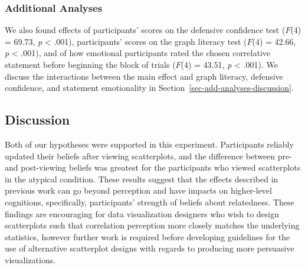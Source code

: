 \documentclass[manuscript,screen,review,anonymous]{acmart}
\begin{document}
\begin{table}

\caption{\label{tbl-condition-interact}Statistics for the significant
main effect of condition on the difference between pre- and post-
scatterplot viewing ratings for typical and atypical plots. Odds ratios
and equivalent Cohen's \emph{d} are also shown. NB: the odds ratio for
the effect of condition is caluclated based on the absolute value of the
estimate.}


\end{table}%

\subsubsection{Additional Analyses}\label{sec-add-analyses}

We also found effects of participants' scores on the defensive
confidence test (\(F\)(4) = 69.73, \emph{p} \textless{} .001),
participants' scores on the graph literacy test (\(F\)(4) = 42.66,
\emph{p} \textless{} .001), and of how emotional participants rated the
chosen correlative statement before beginning the block of trials
(\(F\)(4) = 43.51, \emph{p} \textless{} .001). We discuss the
interactions between the main effect and graph literacy, defensive
confidence, and statement emotionality in
Section~\ref{sec-add-analyses-discussion}.

\subsection{Discussion}\label{sec-main-discussion}

Both of our hypotheses were supported in this experiment. Participants
reliably updated their beliefs after viewing scatterplots, and the
difference between pre- and post-viewing beliefs was greatest for the
participants who viewed scatterplots in the atypical condition. These
results suggest that the effects described in previous work can go
beyond perception and have impacts on higher-level cognitions,
specifically, participants' strength of beliefs about relatedness. These
findings are encouraging for data visualization designers who wish to
design scatterplots such that correlation perception more closely
matches the underlying statistics, however further work is required
before developing guidelines for the use of alternative scatterplot
designs with regards to producing more persuasive visualizations.
\end{document}
